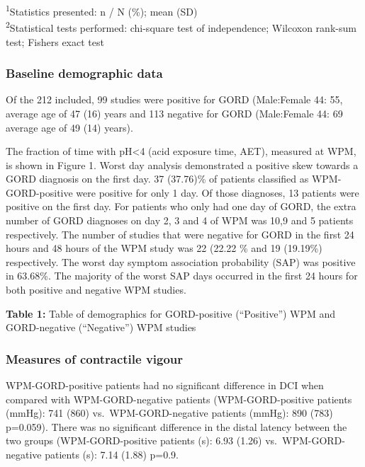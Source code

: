 \documentclass[english,man,floatsintext]{apa6}
\begin{document}
\vspace{-5mm}
\begin{minipage}{\linewidth}
\textsuperscript{1}Statistics presented: n / N (\%); mean (SD) \\ 
\textsuperscript{2}Statistical tests performed: chi-square test of independence; Wilcoxon rank-sum test; Fisher\textquotesingle{}s exact test \\ 
\end{minipage}

\hypertarget{baseline-demographic-data}{%
\subsubsection{Baseline demographic data}\label{baseline-demographic-data}}

Of the 212 included, 99 studies were positive for GORD (Male:Female 44: 55, average age of 47 (16) years and
113 negative for GORD (Male:Female 44: 69 average age of 49 (14) years).

The fraction of time with pH\textless{}4 (acid exposure time, AET), measured at WPM, is shown in Figure 1. Worst day analysis demonstrated a positive skew towards a GORD diagnosis on the first day. 37 (37.76)\% of patients classified as WPM-GORD-positive were positive for only 1 day. Of those diagnoses, 13 patients were positive on the first day. For patients who only had one day of GORD, the extra number of GORD diagnoses on day 2, 3 and 4 of WPM was 10,9 and 5 patients respectively. The number of studies that were negative for GORD in the first 24 hours and 48 hours of the WPM study was 22 (22.22 \% and 19 (19.19\%) respectively. The worst day symptom association probability (SAP) was positive in 63.68\%. The majority of the worst SAP days occurred in the first 24 hours for both positive and negative WPM studies.

\textbf{Table 1:} Table of demographics for GORD-positive (\enquote{Positive}) WPM and GORD-negative (\enquote{Negative}) WPM studies

\hypertarget{measures-of-contractile-vigour}{%
\subsubsection{Measures of contractile vigour}\label{measures-of-contractile-vigour}}

WPM-GORD-positive patients had no significant difference in DCI when compared with WPM-GORD-negative patients (WPM-GORD-positive patients (mmHg): 741 (860) vs.~WPM-GORD-negative patients (mmHg): 890 (783) p=0.059). There was no significant difference in the distal latency between the two groups (WPM-GORD-positive patients (s): 6.93 (1.26) vs.~WPM-GORD-negative patients (s): 7.14 (1.88) p=0.9.
\end{document}
